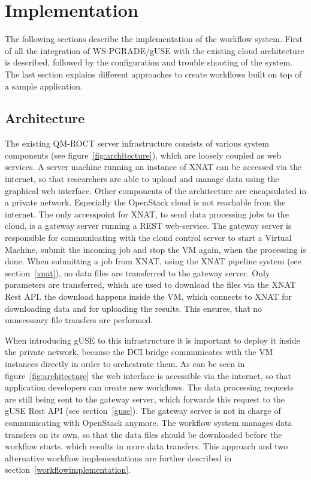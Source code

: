 \section{Implementation}\label{implementation}

The following sections describe the implementation of the workflow system.
First of all the integration of WS-PGRADE/gUSE with the existing cloud architecture is described, followed by the configuration and trouble shooting of the system.
The last section explains different approaches to create workflows built on top of a sample application.

\subsection{Architecture}\label{architecture}

The existing QM-ROCT server infrastructure consists of various system components (see figure~\ref{fig:architecture}), which are loosely coupled as web services.
A server machine running an instance of XNAT can be accessed via the internet, so that researchers are able to upload and manage data using the graphical web interface.
Other components of the architecture are encapsulated in a private network.
Especially the OpenStack cloud is not reachable from the internet. The only accesspoint for XNAT, to send data processing jobs to the cloud, is a gateway server running a REST web-service.
The gateway server is responsible for communicating with the cloud control server to start a Virtual Machine, submit the incoming job and stop the VM again, when the processing is done.
When submitting a job from XNAT, using the XNAT pipeline system (see section~\ref{xnat}), no data files are transferred to the gateway server.
Only parameters are transferred, which are used to download the files via the XNAT Rest API.
the download happens inside the VM, which connects to XNAT for downloading data and for uploading the results.
This ensures, that no unnecessary file transfers are performed. 

When introducing gUSE to this infrastructure it is important to deploy it inside the private network, because the DCI bridge communicates with the VM instances directly in order to orchestrate them.
As can be seen in figure~\ref{fig:architecture} the web interface is accessible via the internet, so that application developers can create new workflows.
The data processing requests are still being sent to the gateway server, which forwards this request to the gUSE Rest API (see section~\ref{guse}).
The gateway server is not in charge of communicating with OpenStack anymore.
The workflow system manages data transfers on its own, so that the data files should be downloaded before the workflow starts, which results in more data transfers.
This approach and two alternative workflow implementations are further described in section~\ref{workflowimplementation}.

